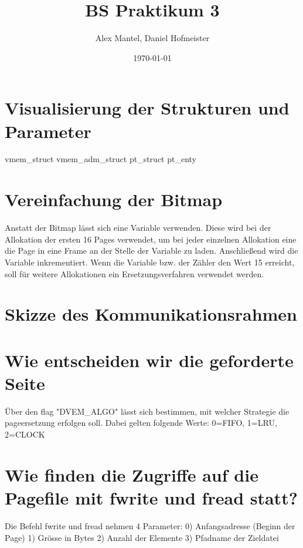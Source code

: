 \documentclass[pdftex,10pt,a4paper]{article}
\begin{document}
\title{BS Praktikum 3}
\author{Alex Mantel, Daniel Hofmeister}
\date{\today}
\maketitle
\newpage

\tableofcontents
\newpage

\section{Visualisierung der Strukturen und Parameter}
        
vmem\_struct
  vmem\_adm\_struct
  pt\_struct
    pt\_enty

\section{Vereinfachung der Bitmap}
Anstatt der Bitmap l\"asst sich eine Variable verwenden. Diese wird bei der Allokation der ersten 16 Pages verwendet, um bei jeder einzelnen Allokation eine die Page in eine Frame an der Stelle der Variable zu laden. Anschlie{\ss}end wird die Variable inkrementiert. Wenn die Variable bzw. der Z\"ahler den Wert 15 erreicht, soll f\"ur weitere Allokationen ein Ersetzungsverfahren verwendet werden.

\section{Skizze des Kommunikationsrahmen}

\section{Wie entscheiden wir die geforderte Seite}
\"Uber den flag "DVEM_ALGO" l\"asst sich bestimmen, mit welcher Strategie die pageersetzung erfolgen soll. Dabei gelten folgende Werte: 0=FIFO, 1=LRU, 2=CLOCK

\section{Wie finden die Zugriffe auf die Pagefile mit fwrite und fread statt?}
Die Befehl fwrite und fread nehmen 4 Parameter:
0) Anfangsadresse (Beginn der Page)
1) Gr\"osse in Bytes
2) Anzahl der Elemente 
3) Pfadname der Zieldatei
\end{document}
